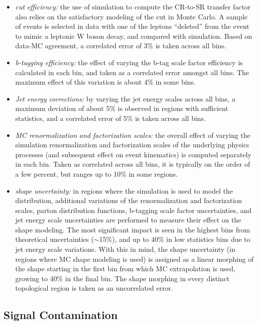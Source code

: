 \begin{itemize}
	\item {\it \Mt cut efficiency:} the use of simulation to compute the CR-to-SR transfer factor also relies on the satisfactory modeling of the \Mt cut in Monte Carlo. A sample of \Zll events is selected in data with one of the leptons ``deleted'' from the event to mimic a leptonic W boson decay, and compared with simulation. Based on data-MC agreement, a correlated error of 3\% is taken across all bins.
	\item {\it b-tagging efficiency:} the effect of varying the b-tag scale factor efficiency is calculated in each bin, and taken as a correlated error amongst all bins. The maximum effect of this variation is about 4\% in some bins.
	\item {\it Jet energy corrections:} by varying the jet energy scales across all bins, a maximum deviation of about 5\% is observed in regions with sufficient statistics, and a correlated error of 5\% is taken across all bins.
	\item {\it MC renormalization and factorization scales:} the overall effect of varying the simulation renormalization and factorization scales of the underlying physics processes (and subsequent effect on event kinematics) is computed separately in each bin. Taken as correlated across all bins, it is typically on the order of a few percent, but ranges up to 10\% in some regions.
	\item {\it \mttwo shape uncertainty:} in regions where the simulation is used to model the \mttwo distribution, additional variations of the renormalization and factorization scales, parton distribution functions, b-tagging scale factor uncertainties, and jet energy scale uncertainties are performed to measure their effect on the \mttwo shape modeling. The most significant impact is seen in the highest \mttwo bins from theoretical uncertainties ($\sim$15\%), and up to 40\% in low statistics bins due to jet energy scale variations. With this in mind, the shape uncertainty (in regions where MC \mttwo shape modeling is used) is assigned as a linear morphing of the \mttwo shape starting in the first bin from which MC extrapolation is used, growing to 40\% in the final bin. The shape morphing in every distinct topological region is taken as an uncorrelated error.
\end{itemize}


\subsection{Signal Contamination}
\label{subsec:signalContamination}

